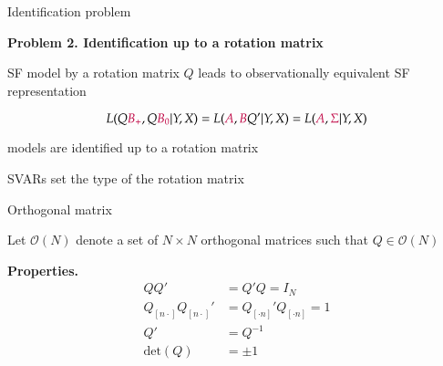 \documentclass[notes,blackandwhite,mathsans,usenames,dvipsnames]{beamer}
\begin{document}
\begin{frame}{Identification problem}

\textbf{Problem 2. Identification up to a rotation matrix}

 {\color{purple}SF} {\color{mcxs2}model by a rotation matrix} $Q$ {\color{mcxs2} leads to observationally equivalent} {\color{purple}SF} {\color{mcxs2} representation}

$$ L(Q{\color{purple}B_{+}},Q{\color{purple}B_0}|Y,X) = L({\color{purple}A},{\color{purple}B}Q'|Y,X) = L({\color{purple}A},{\color{purple}\Sigma}|Y,X) $$

 {\color{mcxs2}models are identified up to a rotation matrix}

 {\color{purple}SVAR}{\color{mcxs2}s set the type of the rotation matrix}

\end{frame}



\begin{frame}{Orthogonal matrix}

{\color{mcxs2}Let} $\mathcal{O}(N)$ {\color{mcxs2}denote a set of $N\times N$ orthogonal matrices such that} $Q\in\mathcal{O}(N)$

\bigskip\textbf{Properties.}
\begin{align*}
QQ' &= Q'Q = I_N\\
Q_{[n\cdot]}Q_{[n\cdot]}' &= Q_{[\cdot n]}'Q_{[\cdot n]} = 1\\
Q' &= Q^{-1}\\
\text{det}(Q)&= \pm1
\end{align*}

\end{frame}
\end{document}

